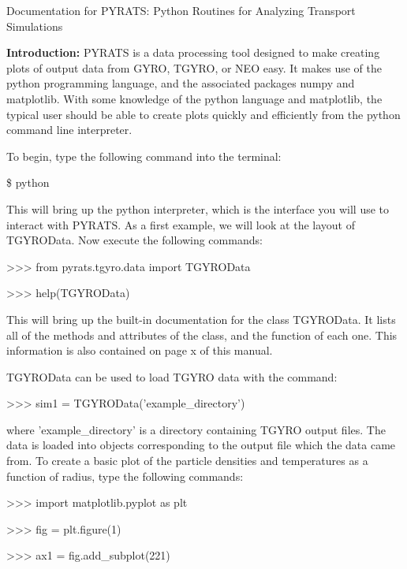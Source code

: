 \documentclass{article}
\begin{document}
\begin{center}
\Large
Documentation for PYRATS:
Python Routines for Analyzing Transport Simulations
\end{center}
\normalsize

\noindent \textbf{Introduction: }PYRATS is a data processing tool designed to make creating plots of output data from GYRO, TGYRO, or NEO easy.  It makes use of the python programming language, and the associated packages numpy and matplotlib.  With some knowledge of the python language and matplotlib, the typical user should be able to create plots quickly and efficiently from the python command line interpreter.

\noindent To begin, type the following command into the terminal:
\fontfamily{\ttdefault}\selectfont

\$ python

\fontfamily{\rmdefault}\selectfont
\noindent This will bring up the python interpreter, which is the interface you will use to interact with PYRATS.  As a first example, we will look at the layout of TGYROData.  Now execute the following commands:
\fontfamily{\ttdefault}\selectfont

>>> from pyrats.tgyro.data import TGYROData
\addtolength{\parskip}{-\baselineskip}

>>> help(TGYROData)

\addtolength{\parskip}{\baselineskip}
\fontfamily{\rmdefault}\selectfont
\noindent This will bring up the built-in documentation for the class TGYROData.  It lists all of the methods and attributes of the class, and the function of each one.  This information is also contained on page x of this manual.

\noindent TGYROData can be used to load TGYRO data with the command:
\fontfamily{\ttdefault}\selectfont

>>> sim1 = TGYROData('example\_directory')

\fontfamily{\rmdefault}\selectfont
\noindent where 'example\_directory' is a directory containing TGYRO output files.  The data is loaded into objects corresponding to the output file which the data came from.  To create a basic plot of the particle densities and temperatures as a function of radius, type the following commands:
\fontfamily{\ttdefault}\selectfont

>>> import matplotlib.pyplot as plt
\addtolength{\parskip}{-\baselineskip}

>>> fig = plt.figure(1)

>>> ax1 = fig.add\_subplot(221)
\end{document}
